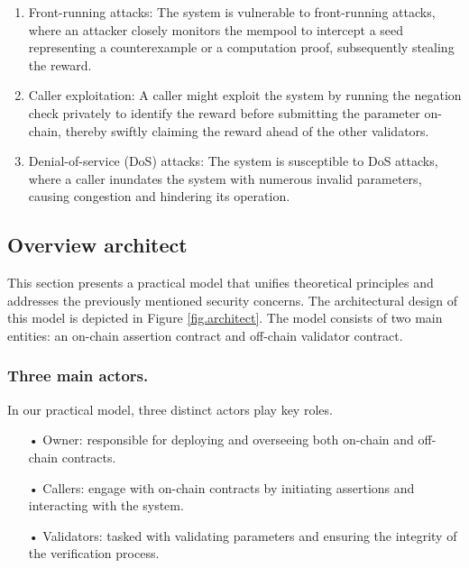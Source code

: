 \documentclass[runningheads]{llncs}
\begin{document}
\begin{enumerate}
\item Front-running attacks: The system is vulnerable to front-running attacks, where an attacker closely monitors the mempool to intercept a seed representing a counterexample or a computation proof, subsequently stealing the reward.
\item Caller exploitation: A caller might exploit the system by running the negation check privately to identify the reward before submitting the parameter on-chain, thereby swiftly claiming the reward ahead of the other validators. 
\item Denial-of-service (DoS) attacks: The system is susceptible to DoS attacks, where a caller inundates the system with numerous invalid parameters, causing congestion and hindering its operation.
\end{enumerate}
\subsection{Overview architect}
This section presents a practical model that unifies theoretical principles and addresses the previously mentioned security concerns. The architectural design of this model is depicted in Figure \ref{fig.architect}. The model consists of two main entities: an on-chain assertion contract and off-chain validator contract. 
\subsubsection{Three main actors.} In our practical model, three distinct actors play key roles.
\begin{itemize}
\item[•] Owner: responsible for deploying and overseeing both on-chain and off-chain contracts.
\item[•] Callers: engage with on-chain contracts by initiating assertions and interacting with the system.
\item[•] Validators: tasked with validating parameters and ensuring the integrity of the verification process.
\end{itemize}
\end{document}
